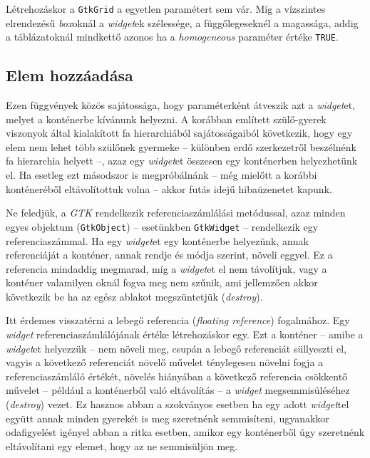 Létrehozáskor a \texttt{GtkGrid} a egyetlen paramétert sem vár. Míg a vízszintes elrendezésű \textit{box}oknál a \textit{widget}ek szélessége, a függőlegeseknél a magassága, addig a táblázatoknál mindkettő azonos ha a \textit{homogeneous} paraméter értéke \texttt{TRUE}.

\subsection{Elem hozzáadása}

Ezen függvények közös sajátossága, hogy paraméterként átveszik azt a \textit{widget}et, melyet a konténerbe kívánunk helyezni. A korábban említett szülő-gyerek viszonyok által kialakított fa hierarchiából sajátosságaiból következik, hogy egy elem nem lehet több szülőnek gyermeke -- különben erdő szerkezetről beszélnénk fa hierarchia helyett --, azaz egy \textit{widget}et összesen egy konténerben helyezhetünk el. Ha esetleg ezt másodszor is megpróbálnánk -- még mielőtt a korábbi konténeréből eltávolítottuk volna -- akkor futás idejű hibaüzenetet kapunk.

Ne feledjük, a \textit{GTK} rendelkezik referenciaszámlálási metódussal, azaz minden egyes objektum (\texttt{GtkObject}) -- esetünkben \texttt{GtkWidget} -- rendelkezik egy referenciaszámmal. Ha egy \textit{widget}et egy konténerbe helyezünk, annak referenciáját a konténer, annak rendje és módja szerint, növeli eggyel. Ez a referencia mindaddig megmarad, míg a \textit{widget}et el nem távolítjuk, vagy a konténer valamilyen oknál fogva meg nem szűnik, ami jellemzően akkor következik be ha az egész ablakot megszüntetjük (\textit{destroy}).

Itt érdemes visszatérni a lebegő referencia (\textit{floating reference}) fogalmához. Egy \textit{widget} referenciaszámlálójának értéke létrehozáskor egy. Ezt a konténer -- amibe a \textit{widget}et helyezzük -- nem növeli meg, csupán a lebegő referenciát süllyeszti el, vagyis a következő referenciát növelő művelet ténylegesen növelni fogja a referenciaszámláló értékét, növelés hiányában a következő referencia csökkentő művelet -- például a konténerből való eltávolítás -- a \textit{widget} megsemmisüléséhez (\textit{destroy}) vezet. Ez hasznos abban a szokványos esetben ha egy adott \textit{widget}tel együtt annak minden gyerekét is meg szeretnénk semmisíteni, ugyanakkor odafigyelést igényel abban a ritka esetben, amikor egy konténerből úgy szeretnénk eltávolítani egy elemet, hogy az ne semmisüljön meg.


